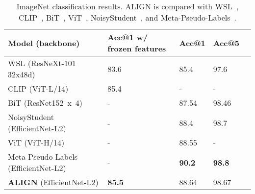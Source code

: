 \documentclass{article}
\begin{document}
\begin{table}[h!]
\vspace{-3mm}
\begin{center}
\caption{Top-1 Accuracy of zero-shot transfer of ALIGN to image classification on ImageNet and its variants.}
\label{tab:zs_imagenet_result}
\vskip -0.1in
\begin{small}
\end{small}
\end{center}
\vspace{-3mm}
\end{table}

\begin{table*}[t!]
\vspace{-3mm}
\begin{center}
\caption{ImageNet classification results. ALIGN is compared with WSL~\cite{mahajan:wsl}, CLIP~\cite{radford:clip}, BiT~\cite{kolensnikov:bit}, ViT~\cite{dosovitskiy:vit}, NoisyStudent~\cite{xie:noisy_student}, and Meta-Pseudo-Labels~\cite{pham:mpl}.}
\label{tab:imagenet_result}
\begin{small}
\begin{tabular}{l|llll}
\toprule
Model (backbone) & Acc@1 w/ frozen features & Acc@1 & Acc@5\\
\midrule
WSL (ResNeXt-101 32x48d) & 83.6 & 85.4 & 97.6 \\
CLIP (ViT-L/14) & 85.4 & - & - \\
BiT (ResNet152~x~4) & - & 87.54 & 98.46 \\
NoisyStudent (EfficientNet-L2) & - & 88.4 & 98.7 \\
ViT (ViT-H/14) & - & 88.55 & - \\
Meta-Pseudo-Labels (EfficientNet-L2) & - & \textbf{90.2} & \textbf{98.8} \\
\textbf{ALIGN} (EfficientNet-L2) & \textbf{85.5} & 88.64 & 98.67 \\ 
\bottomrule
\end{tabular}
\end{small}
\end{center}
\vspace{-5mm}
\end{table*}
\end{document}
